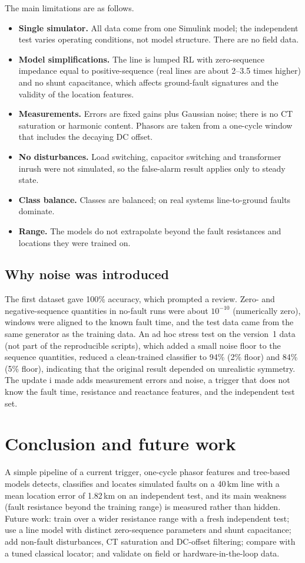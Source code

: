 \documentclass[11pt,a4paper]{article}
\begin{document}
The main limitations are as follows.
\begin{itemize}
\item \textbf{Single simulator.} All data come from one Simulink model; the independent test varies operating conditions, not model structure. There are no field data.
\item \textbf{Model simplifications.} The line is lumped RL with zero-sequence impedance equal to positive-sequence (real lines are about 2--3.5 times higher) and no shunt capacitance, which affects ground-fault signatures and the validity of the location features.
\item \textbf{Measurements.} Errors are fixed gains plus Gaussian noise; there is no CT saturation or harmonic content. Phasors are taken from a one-cycle window that includes the decaying DC offset.
\item \textbf{No disturbances.} Load switching, capacitor switching and transformer inrush were not simulated, so the false-alarm result applies only to steady state.
\item \textbf{Class balance.} Classes are balanced; on real systems line-to-ground faults dominate.
\item \textbf{Range.} The models do not extrapolate beyond the fault resistances and locations they were trained on.
\end{itemize}

\subsection{Why noise was introduced}\label{sec:v2}
The first dataset gave 100\% accuracy, which prompted a review. Zero- and negative-sequence quantities in no-fault runs were about $10^{-10}$ (numerically zero), windows were aligned to the known fault time, and the test data came from the same generator as the training data. An ad hoc stress test on the version~1 data (not part of the reproducible scripts), which added a small noise floor to the sequence quantities, reduced a clean-trained classifier to 94\% (2\% floor) and 84\% (5\% floor), indicating that the original result depended on unrealistic symmetry. The update i made adds measurement errors and noise, a trigger that does not know the fault time, resistance and reactance features, and the independent test set.

\section{Conclusion and future work}
A simple pipeline of a current trigger, one-cycle phasor features and tree-based models detects, classifies and locates simulated faults on a 40\,km line with a mean location error of 1.82\,km on an independent test, and its main weakness (fault resistance beyond the training range) is measured rather than hidden. Future work: train over a wider resistance range with a fresh independent test; use a line model with distinct zero-sequence parameters and shunt capacitance; add non-fault disturbances, CT saturation and DC-offset filtering; compare with a tuned classical locator; and validate on field or hardware-in-the-loop data.
\end{document}
